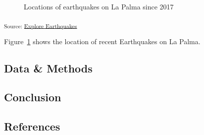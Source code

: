 \documentclass[
]{agujournal2019}
\begin{document}
\begin{figure}[H]


\caption{\label{fig-spatial-plot}Locations of earthquakes on La Palma
since 2017}

\end{figure}%

\textsubscript{Source:
\href{https://rvcrawford.github.io/glowing-system/notebooks/explore-earthquakes-preview.html\#cell-fig-spatial-plot}{Explore
Earthquakes}}

Figure~\ref{fig-spatial-plot} shows the location of recent Earthquakes
on La Palma.

\subsection{Data \& Methods}\label{sec-data-methods}

\subsection{Conclusion}\label{conclusion}

\subsection*{References}\label{references-1}
\end{document}
